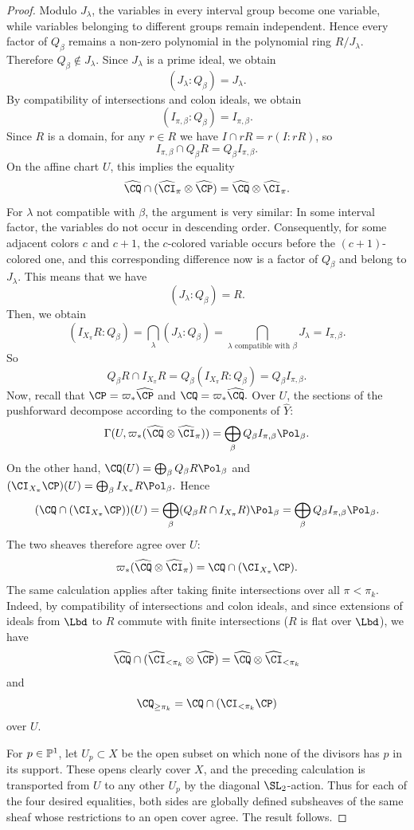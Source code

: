 \documentclass[11pt,reqno]{amsart}
\begin{document}
\begin{proof}
Modulo $J_\lambda$, the variables in every interval group become one
variable, while variables belonging to different groups remain
independent. Hence every factor of $Q_\beta$ remains a non-zero
polynomial in the polynomial ring $R/J_\lambda$. Therefore
$Q_\beta\notin J_\lambda$. Since $J_\lambda$ is a prime ideal, we obtain
\[
(J_\lambda\colon Q_\beta)=J_\lambda.
\] By compatibility of intersections and colon ideals, we obtain \[(I_{\pi,\beta}\colon Q_\beta)=I_{\pi,\beta}.\] Since $R$ is a domain, for any $r\in R$ we have $I\cap rR = r(I\colon rR)$, so \[I_{\pi,\beta}\cap Q_\beta R=Q_\beta I_{\pi,\beta}.\] On the affine chart $U$, this implies the equality \[
\widehat{\CQ}\cap(\widehat{\CI}_\pi\otimes\widehat{\CP})=\widehat{\CQ}\otimes\widehat{\CI}_\pi.\] For $\lambda$ not compatible with $\beta$, the argument is very similar: In some interval factor, the variables do not occur in descending order. Consequently, for some adjacent colors $c$ and $c+1$, the $c$-colored variable occurs before the $(c+1)$-colored one, and this corresponding difference now is a factor of $Q_\beta$ and belong to $J_\lambda$. This means that we have \[(J_\lambda \colon Q_\beta) = R.\] Then, we obtain \[(I_{X_\pi} R\colon Q_\beta) = \bigcap_\lambda(J_\lambda\colon Q_\beta) = \bigcap_{\lambda \text{ compatible with }\beta}J_\lambda = I_{\pi, \beta}.\] So \[Q_\beta R\cap I_{X_\pi} R = Q_\beta(I_{X_\pi} R\colon Q_\beta) = Q_\beta I_{\pi, \beta}.\] Now, recall that
$\CP=\varpi_*\widehat{\CP}$ and $\CQ=\varpi_*\widehat{\CQ}.$
Over $U$, the sections of the pushforward decompose according to the
components of $\widehat Y$:
\[\Gamma(U,\varpi_*(\widehat{\CQ}\otimes\widehat{\CI}_\pi))=\bigoplus_\beta Q_\beta I_{\pi,\beta}\Pol_\beta.\]
On the other hand, $\CQ(U)=\bigoplus_\beta Q_\beta R\Pol_\beta$ and $(\CI_{X_\pi}\CP)(U)=\bigoplus_\beta I_{X_\pi} R\Pol_\beta.$ Hence
\[(\CQ\cap(\CI_{X_\pi}\CP))(U)=\bigoplus_\beta
(Q_\beta R\cap I_{X_\pi} R)\Pol_\beta=
\bigoplus_\beta Q_\beta I_{\pi,\beta}\Pol_\beta.\]
The two sheaves therefore agree over $U$:\[
\varpi_*(\widehat{\CQ}\otimes\widehat{\CI}_\pi)=\CQ\cap(\CI_{X_\pi}\CP).\] The same calculation applies after taking finite intersections over
all $\pi<\pi_k$. Indeed, by compatibility of intersections and colon ideals, and since
extensions of ideals from $\Lbd$ to $R$ commute with finite intersections ($R$ is flat over $\Lbd$), we have \[\widehat{\CQ}\cap (\widehat{\CI}_{<\pi_k}\otimes\widehat{\CP})=\widehat{\CQ}\otimes\widehat{\CI}_{<\pi_k}\] and \[\CQ_{\ge\pi_k}=\CQ\cap(\CI_{<\pi_k}\CP)\]
over $U$.

For $p\in\mathbb P^1$, let $U_p\subset X$ be the open subset on which none of the divisors has $p$ in its support. These opens clearly cover $X$, and the preceding calculation is transported
from $U$ to any other $U_p$ by the diagonal $\SL_2$-action. Thus for each of the four desired equalities, both sides are globally defined
subsheaves of the same sheaf whose restrictions to an open cover agree. The result follows.
\end{proof}
\end{document}
